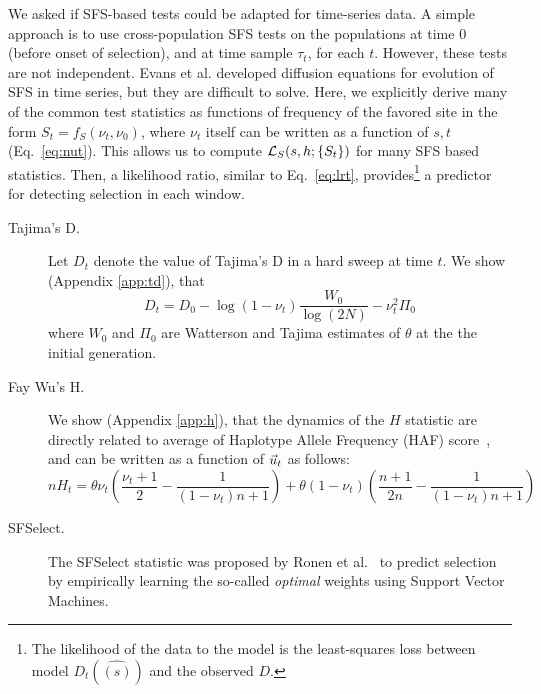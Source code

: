 \documentclass[11pt]{article}
\begin{document}
We asked if SFS-based tests could be adapted for time-series data. A
simple approach is to use cross-population SFS tests on the
populations at time $0$ (before onset of selection), and at time
sample $\tau_t$, for each $t$. However, these tests are not
independent. Evans et al.  \cite{evans2007non} developed diffusion
equations for evolution of SFS in time series, but they are difficult
to solve. Here, we explicitly derive many of the common test
statistics as functions of frequency of the favored site in the form
$S_t=f_S(\nu_t,\nu_0)$, where $\nu_t$ itself can be written as a
function of $s,t$ (Eq.~\ref{eq:nut}). This allows us to compute
${\cal L}_S(s,h; \{S_t\})$ for many SFS based statistics. Then, a
likelihood ratio, similar to Eq.~\ref{eq:lrt}, provides\footnote{The
  likelihood of the data to the model is the least-squares loss
  between model $D_t(\hat{(s)})$ and the observed $D$.} a predictor
for detecting selection in each window.
\begin{description}
\item [Tajima's D.] Let $D_t$ denote the value of Tajima's D in a hard
  sweep at time $t$. We show (Appendix \ref{app:td}), that
  \begin{equation}
    D_t=D_0-\log(1-\nu_t) \frac{W_0}{\log(2N)} -\nu_t^2 \Pi_0
    \label{eq:tdt}    
  \end{equation}
  where $W_0$ and $\Pi_0$ are Watterson and Tajima estimates of
  $\theta$ at the the initial generation.  
\item[Fay Wu's H.] We show (Appendix \ref{app:h}), that the dynamics
  of the $H$ statistic are directly related to average of Haplotype
  Allele Frequency (HAF) score~\cite{ronen2015predicting}, and can be
  written as a function of $\vec{u}_t$ as follows:
  \begin{equation}
    nH_t= \theta \nu_t \left(\frac{\nu_t+1}{2} -
      \frac{1}{(1-\nu_t)n+1}\right) + \theta
    (1-\nu_t)\left(\frac{n+1}{2n}-\frac{1}{(1-\nu_t)n+1}\right)
    \label{eq:ht}
  \end{equation}	
	
\item[SFSelect.] The SFSelect statistic was proposed by Ronen et
  al.~\cite{ronen2013learning} to predict selection by empirically
  learning the so-called \emph{optimal} weights using Support Vector
  Machines.
\end{description}
\end{document}
